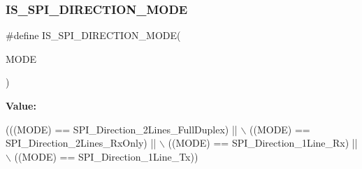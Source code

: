 \subsubsection{\texorpdfstring{I\+S\+\_\+\+S\+P\+I\+\_\+\+D\+I\+R\+E\+C\+T\+I\+O\+N\+\_\+\+M\+O\+DE}{IS\_SPI\_DIRECTION\_MODE}}
{\footnotesize\ttfamily \#define I\+S\+\_\+\+S\+P\+I\+\_\+\+D\+I\+R\+E\+C\+T\+I\+O\+N\+\_\+\+M\+O\+DE(\begin{DoxyParamCaption}\item[{}]{M\+O\+DE }\end{DoxyParamCaption})}

{\bfseries Value\+:}
\begin{DoxyCode}
(((MODE) == SPI\_Direction\_2Lines\_FullDuplex) || \(\backslash\)
                                     ((MODE) == SPI\_Direction\_2Lines\_RxOnly) || \(\backslash\)
                                     ((MODE) == SPI\_Direction\_1Line\_Rx) || \(\backslash\)
                                     ((MODE) == SPI\_Direction\_1Line\_Tx))
\end{DoxyCode}
